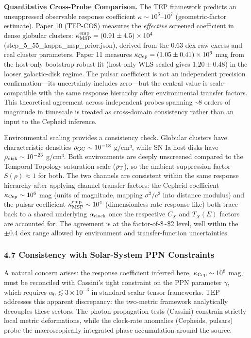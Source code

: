 \documentclass[
]{article}
\begin{document}
\textbf{Quantitative Cross-Probe Comparison.} The TEP framework predicts
an unsuppressed observable response coefficient
\(\kappa \sim 10^6\)--\(10^7\) (geometric-factor estimate). Paper 10
(TEP-COS) measures the \emph{effective} screened coefficient in dense
globular clusters:
\(\kappa_{\rm MSP}^{\rm emp} = (0.91 \pm 4.5) \times 10^4\)
(step\_5\_55\_kappa\_msp\_prior.json), derived from the 0.63 dex raw
excess and real cluster parameters. Paper 11 measures
\(\kappa_{\rm Cep} = (1.05 \pm 0.41) \times 10^6\) mag from the
host-only bootstrap robust fit (host-only WLS scaled gives
\(1.20 \pm 0.48\)) in the looser galactic-disk regime. The pulsar
coefficient is not an independent precision confirmation---its
uncertainty includes zero---but the central value is scale-compatible
with the same response hierarchy after environmental transfer factors.
This theoretical agreement across independent probes spanning
\textasciitilde8 orders of magnitude in timescale is treated as
cross-domain consistency rather than an input to the Cepheid inference.

Environmental scaling provides a consistency check. Globular clusters
have characteristic densities \(\rho_{\rm GC} \sim 10^{-18}\) g/cm³,
while SN Ia host disks have \(\rho_{\rm disk} \sim 10^{-23}\) g/cm³.
Both environments are deeply unscreened compared to the Temporal
Topology saturation scale (\(\rho_{\rm T}\)), so the ambient suppression
factor \(S(\rho) \approx 1\) for both. The two channels are consistent
within the same response hierarchy after applying channel transfer
factors: the Cepheid coefficient \(\kappa_{\rm Cep} \sim 10^6\) mag
(units of magnitude, mapping \(\sigma^2/c^2\) into distance modulus) and
the pulsar coefficient \(\kappa_{\rm MSP}^{\rm emp} \sim 10^4\)
(dimensionless rate-response-like) both trace back to a shared
underlying \(\alpha_{\rm clock}\) once the respective \(C_X\) and
\(T_X(E)\) factors are accounted for. The agreement is at the
factor-of-\$\sim\$2 level, well within the \(\pm 0.4\) dex range allowed
by environment and transfer-function uncertainties.

\subsubsection{4.7 Consistency with Solar-System PPN
Constraints}\label{consistency-with-solar-system-ppn-constraints}

A natural concern arises: the response coefficient inferred here,
\(\kappa_{\rm Cep} \sim 10^6\) mag, must be reconciled with Cassini's
tight constraint on the PPN parameter \(\gamma\), which requires
\(\alpha_0 \lesssim 3 \times 10^{-3}\) in standard scalar-tensor
frameworks. TEP addresses this apparent discrepancy: the two-metric
framework analytically decouples these sectors. The photon propagation
tests (Cassini) constrain strictly local metric deformations, while the
clock-rate anomalies (Cepheids, pulsars) probe the macroscopically
integrated phase accumulation around the source.
\end{document}

